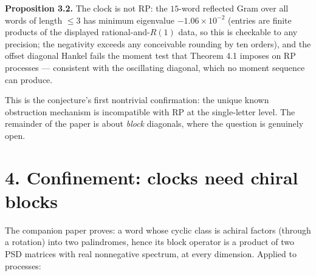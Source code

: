 \documentclass[11pt]{article}
\begin{document}
\textbf{Proposition 3.2.}  The clock is not RP: the $15$-word reflected Gram over all words of length $\le 3$ has minimum eigenvalue $-1.06\times 10^{-2}$ (entries are finite products of the displayed rational-and-$R(1)$ data, so this is checkable to any precision; the negativity exceeds any conceivable rounding by ten orders), and the offset diagonal Hankel fails the moment test that Theorem 4.1 imposes on RP processes — consistent with the oscillating diagonal, which no moment sequence can produce.

This is the conjecture's first nontrivial confirmation: the unique known obstruction mechanism is incompatible with RP at the single-letter level.  The remainder of the paper is about \emph{block} diagonals, where the question is genuinely open.

\section*{4. Confinement: clocks need chiral blocks}
The companion paper proves: a word whose cyclic class is achiral factors (through a rotation) into two palindromes, hence its block operator is a product of two PSD matrices with real nonnegative spectrum, at every dimension.  Applied to processes:
\end{document}
